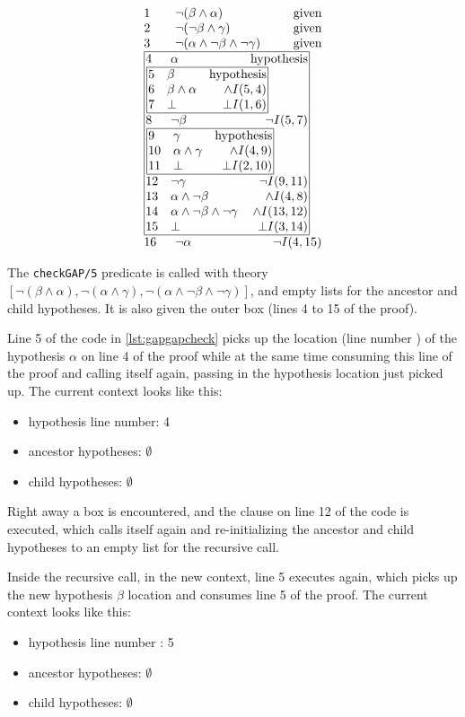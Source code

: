 \documentclass[11pt,twoside,a4paper]{report}
\begin{document}
\[\vbox{\offinterlineskip\halign{
&\tabskip=1.5em#\strut&$#$\hfil\tabskip=1em&\hfil$#$\tabskip=0em\cr
%
1&\neg(\beta\wedge\alpha)&\mbox{given}\cr
2&\neg(\neg\beta\wedge\gamma)&\mbox{given}\cr
3&\neg(\alpha\wedge\neg\beta\wedge\neg\gamma)&\mbox{given}\cr
%
\multispan3\vbox{\halign{
\vrule#&&\hskip.1em\tabskip=1em#\strut&$#$\hfil\tabskip=1em&\hfil$#$\hskip0.1em\tabskip=0em&\vrule#\cr
\noalign{\hrule}
%
&4&\alpha&\mbox{hypothesis}&\cr
%
&\multispan3\,\vbox{\halign{
\vrule#&&\hskip.1em\tabskip=1em#\strut&$#$\hfil\tabskip=1em&\hfil$#$\hskip0.1em\tabskip=0em&\vrule#\cr
\noalign{\hrule}
%
&5&\beta&\mbox{hypothesis}&\cr
&6&\beta\wedge\alpha&\wedge I(5,4)&\cr
&7&\bot&\bot I(1,6)&\cr
%
\noalign{\hrule}}}\,&\cr
%
&8&\neg\beta&\neg I(5,7)&\cr
%
&\multispan3\,\vbox{\halign{
\vrule#&&\hskip.1em\tabskip=1em#\strut&$#$\hfil\tabskip=1em&\hfil$#$\hskip0.1em\tabskip=0em&\vrule#\cr
\noalign{\hrule}
%
&9&\gamma&\mbox{hypothesis}&\cr
&10&\alpha\wedge\gamma&\wedge I(4,9)&\cr
&11&\bot&\bot I(2,10)&\cr
%
\noalign{\hrule}}}\,&\cr
%
&12&\neg\gamma&\neg I(9,11)&\cr
&13&\alpha\wedge\neg\beta&\wedge I(4,8)&\cr
&14&\alpha\wedge\neg\beta\wedge\neg\gamma&\wedge I(13,12)&\cr
&15&\bot&\bot I(3,14)&\cr
%
\noalign{\hrule}}}\,\cr
%
16&\neg\alpha&\neg I(4,15)\cr
}}\]

The \lstinline$checkGAP/5$ predicate is called with theory $[\neg(\beta\wedge\alpha), \neg(\alpha\wedge\gamma), \neg(\alpha\wedge\neg\beta\wedge\neg\gamma)]$, and empty lists for the ancestor and child hypotheses. It is also given the outer box (lines 4 to 15 of the proof). 

Line 5 of the code in \autoref{lst:gapgapcheck} picks up the location (line number ) of the hypothesis $\alpha$ on line 4 of the proof while at the same time consuming this line of the proof and calling itself again, passing in the hypothesis location just picked up. The current context looks like this:
\begin{itemize}
\item
hypothesis line number: 4
\item
ancestor hypotheses: $\emptyset$
\item
child hypotheses: $\emptyset$
\end{itemize}

Right away a box is encountered, and the clause on line 12 of the code is executed, which calls itself again and re-initializing the ancestor and child hypotheses to an empty list for the recursive call.

Inside the recursive call, in the new context, line 5 executes again, which picks up the new hypothesis $\beta$ location and consumes line 5 of the proof. The current context looks like this:
\begin{itemize}
\item
hypothesis line number : 5
\item
ancestor hypotheses: $\emptyset$
\item
child hypotheses: $\emptyset$
\end{itemize}
\end{document}
